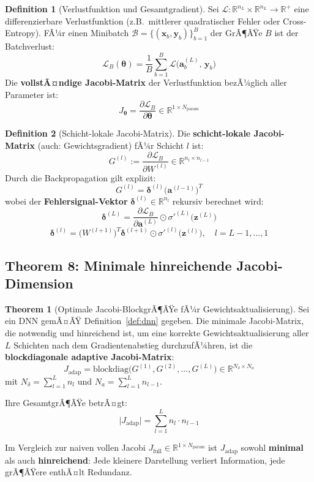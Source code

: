 ﻿\documentclass[a4paper,12pt]{article}
\theoremstyle{definition}
\newtheorem{definition}{Definition}
\newtheorem{theorem}{Theorem}
\begin{document}
\begin{definition}[Verlustfunktion und Gesamtgradient]
	\label{def:loss}
	Sei $\mathcal{L}: \mathbb{R}^{n_L} \times \mathbb{R}^{n_L} \to \mathbb{R}^+$ eine differenzierbare Verlustfunktion (z.B.\ mittlerer quadratischer Fehler oder Cross-Entropy). FÃ¼r einen Minibatch $\mathcal{B} = \{(\boldsymbol{x}_b, \boldsymbol{y}_b)\}_{b=1}^B$ der GrÃ¶ÃŸe $B$ ist der Batchverlust:
	\[
	\mathcal{L}_B(\boldsymbol{\theta}) = \frac{1}{B} \sum_{b=1}^B \mathcal{L}\bigl(\boldsymbol{a}^{(L)}_b,\, \boldsymbol{y}_b\bigr)
	\]
	Die \textbf{vollstÃ¤ndige Jacobi-Matrix} der Verlustfunktion bezÃ¼glich aller Parameter ist:
	\[
	J_{\boldsymbol{\theta}} = \frac{\partial \mathcal{L}_B}{\partial \boldsymbol{\theta}} \in \mathbb{R}^{1 \times N_{\mathrm{param}}}
	\]
\end{definition}

\begin{definition}[Schicht-lokale Jacobi-Matrix]
	\label{def:local_jacobi}
	Die \textbf{schicht-lokale Jacobi-Matrix} (auch: Gewichtsgradient) fÃ¼r Schicht $l$ ist:
	\[
	G^{(l)} := \frac{\partial \mathcal{L}_B}{\partial W^{(l)}} \in \mathbb{R}^{n_l \times n_{l-1}}
	\]
	Durch die Backpropagation gilt explizit:
	\[
	G^{(l)} = \boldsymbol{\delta}^{(l)} \bigl(\boldsymbol{a}^{(l-1)}\bigr)^T
	\]
	wobei der \textbf{Fehlersignal-Vektor} $\boldsymbol{\delta}^{(l)} \in \mathbb{R}^{n_l}$ rekursiv berechnet wird:
	\[
	\boldsymbol{\delta}^{(L)} = \frac{\partial \mathcal{L}_B}{\partial \boldsymbol{a}^{(L)}} \odot \sigma'^{(L)}\bigl(\boldsymbol{z}^{(L)}\bigr)
	\]
	\[
	\boldsymbol{\delta}^{(l)} = \bigl(W^{(l+1)}\bigr)^T \boldsymbol{\delta}^{(l+1)} \odot \sigma'^{(l)}\bigl(\boldsymbol{z}^{(l)}\bigr), \quad l = L-1, \ldots, 1
	\]
\end{definition}

\subsection{Theorem 8: Minimale hinreichende Jacobi-Dimension}

\begin{theorem}[Optimale Jacobi-BlockgrÃ¶ÃŸe fÃ¼r Gewichtsaktualisierung]
	\label{thm:optimal_size}
	Sei ein DNN gemÃ¤ÃŸ Definition~\ref{def:dnn} gegeben. Die minimale Jacobi-Matrix, die notwendig und hinreichend ist, um eine korrekte Gewichtsaktualisierung aller $L$ Schichten nach dem Gradientenabstieg durchzufÃ¼hren, ist die \textbf{blockdiagonale adaptive Jacobi-Matrix}:
	\[
	J_{\mathrm{adap}} = \mathrm{blockdiag}\bigl(G^{(1)}, G^{(2)}, \ldots, G^{(L)}\bigr) \in \mathbb{R}^{N_{\delta} \times N_a}
	\]
	mit $N_{\delta} = \sum_{l=1}^L n_l$ und $N_a = \sum_{l=1}^L n_{l-1}$.

	Ihre GesamtgrÃ¶ÃŸe betrÃ¤gt:
	\[
	\bigl|J_{\mathrm{adap}}\bigr| = \sum_{l=1}^L n_l \cdot n_{l-1}
	\]
	
	Im Vergleich zur naiven vollen Jacobi $J_{\mathrm{full}} \in \mathbb{R}^{1 \times N_{\mathrm{param}}}$ ist $J_{\mathrm{adap}}$ sowohl \textbf{minimal} als auch \textbf{hinreichend}: Jede kleinere Darstellung verliert Information, jede grÃ¶ÃŸere enthÃ¤lt Redundanz.
\end{theorem}
\end{document}

